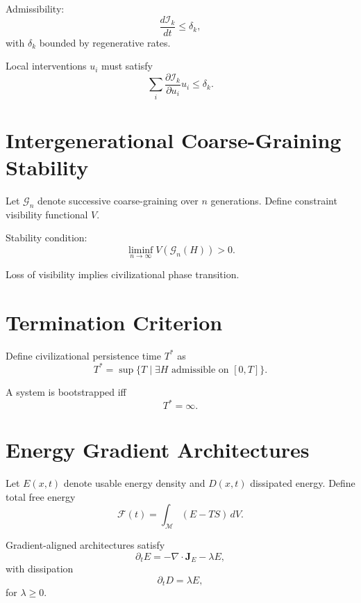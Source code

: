 \documentclass[12pt,oneside]{book}
\begin{document}
Admissibility:
\begin{equation}
\frac{d\mathcal{I}_k}{dt} \le \delta_k,
\end{equation}
with \(\delta_k\) bounded by regenerative rates.

Local interventions \(u_i\) must satisfy
\begin{equation}
\sum_i \frac{\partial \mathcal{I}_k}{\partial u_i} u_i \le \delta_k.
\end{equation}

\chapter{Intergenerational Coarse-Graining Stability}

Let \(\mathcal{G}_n\) denote successive coarse-graining over \(n\) generations.
Define constraint visibility functional \(V\).

Stability condition:
\begin{equation}
\liminf_{n\to\infty} V(\mathcal{G}_n(H)) > 0.
\end{equation}

Loss of visibility implies civilizational phase transition.

\chapter{Termination Criterion}

Define civilizational persistence time \(T^*\) as
\begin{equation}
T^* = \sup \{ T \mid \exists H \text{ admissible on } [0,T] \}.
\end{equation}

A system is bootstrapped iff
\begin{equation}
T^* = \infty.
\end{equation}

\chapter{Energy Gradient Architectures}

Let \(E(x,t)\) denote usable energy density and \(D(x,t)\) dissipated energy.
Define total free energy
\[
\mathcal{F}(t) = \int_{\mathcal{M}} (E - T S)\, dV.
\]

Gradient-aligned architectures satisfy
\begin{equation}
\partial_t E = -\nabla \cdot \mathbf{J}_E - \lambda E,
\end{equation}
with dissipation
\begin{equation}
\partial_t D = \lambda E,
\end{equation}
for \(\lambda \ge 0\).
\end{document}
